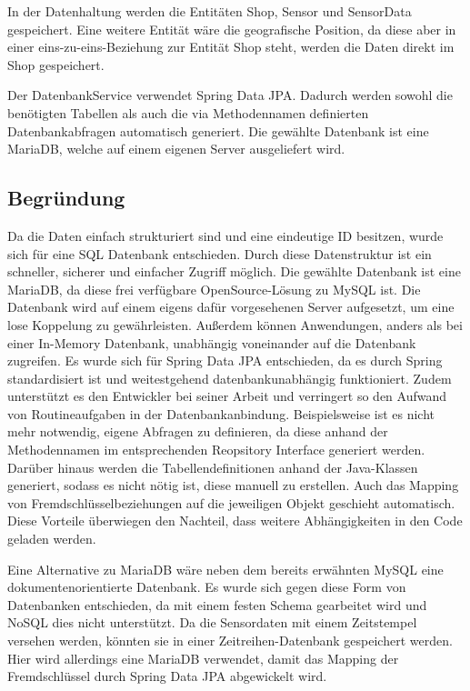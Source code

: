 \documentclass[runningheads]{llncs}
\begin{document}
In der Datenhaltung werden die Entitäten Shop, Sensor und SensorData gespeichert.
Eine weitere Entität wäre die geografische Position, da diese aber in einer eins-zu-eins-Beziehung zur Entität Shop steht, werden die Daten direkt im Shop gespeichert.

Der DatenbankService verwendet Spring Data JPA.
Dadurch werden sowohl die benötigten Tabellen als auch die via Methodennamen definierten Datenbankabfragen automatisch generiert.
Die gewählte Datenbank ist eine MariaDB, welche auf einem eigenen Server ausgeliefert wird.


\subsection{Begründung}
Da die Daten einfach strukturiert sind und eine eindeutige ID besitzen, wurde sich für eine SQL Datenbank entschieden.
Durch diese Datenstruktur ist ein schneller, sicherer und einfacher Zugriff möglich.
Die gewählte Datenbank ist eine MariaDB, da diese frei verfügbare OpenSource-Lösung zu MySQL ist.
Die Datenbank wird auf einem eigens dafür vorgesehenen Server aufgesetzt, um eine lose Koppelung zu gewährleisten. 
Außerdem können Anwendungen, anders als bei einer In-Memory Datenbank, unabhängig voneinander auf die Datenbank zugreifen.
Es wurde sich für Spring Data JPA entschieden, da es durch Spring standardisiert ist und weitestgehend datenbankunabhängig funktioniert.
Zudem unterstützt es den Entwickler bei seiner Arbeit  und verringert so den Aufwand von Routineaufgaben in der Datenbankanbindung.
Beispielsweise ist es nicht mehr notwendig, eigene Abfragen zu definieren, da diese anhand der Methodennamen im entsprechenden Reopsitory Interface generiert werden.
Darüber hinaus werden die Tabellendefinitionen anhand der Java-Klassen generiert, sodass es nicht nötig ist, diese manuell zu erstellen.
Auch das Mapping von Fremdschlüsselbeziehungen auf die jeweiligen Objekt geschieht automatisch.
Diese Vorteile überwiegen den Nachteil, dass weitere Abhängigkeiten in den Code geladen werden.

Eine Alternative zu MariaDB wäre neben dem bereits erwähnten MySQL eine dokumentenorientierte Datenbank.
Es wurde sich gegen diese Form von Datenbanken entschieden, da mit einem festen Schema gearbeitet wird und NoSQL dies nicht unterstützt.
Da die Sensordaten mit einem Zeitstempel versehen werden, könnten sie in einer Zeitreihen-Datenbank gespeichert werden.
Hier wird allerdings eine MariaDB verwendet, damit das Mapping der Fremdschlüssel durch Spring Data JPA abgewickelt wird.
\end{document}
